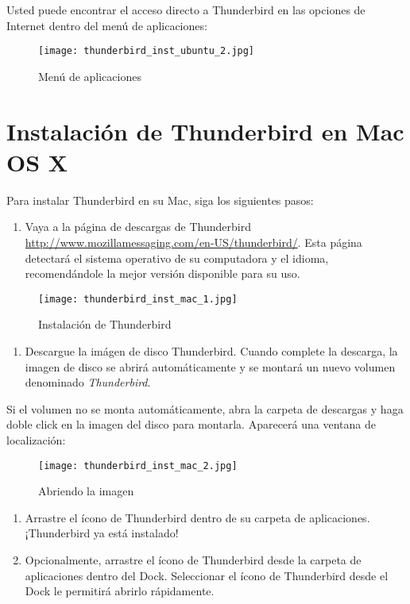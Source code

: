 \documentclass[10pt,a5paper,twoside,,]{book}
\providecommand{\tightlist}{%
  \setlength{\itemsep}{0pt}\setlength{\parskip}{0pt}}
\begin{document}
Usted puede encontrar el acceso directo a Thunderbird en las opciones de
Internet dentro del menú de aplicaciones:

\begin{figure}[htbp]
\centering
\texttt{[image: thunderbird\_inst\_ubuntu\_2.jpg]}
\caption{Menú de aplicaciones}
\end{figure}

\section{Instalación de Thunderbird en Mac OS
X}\label{instalaciuxf3n-de-thunderbird-en-mac-os-x}

Para instalar Thunderbird en su Mac, siga los siguientes pasos:

\begin{enumerate}
\def\labelenumi{\arabic{enumi}.}
\tightlist
\item
  Vaya a la página de descargas de Thunderbird
  \url{http://www.mozillamessaging.com/en-US/thunderbird/}. Esta página
  detectará el sistema operativo de su computadora y el idioma,
  recomendándole la mejor versión disponible para su uso.
\end{enumerate}

\begin{figure}[htbp]
\centering
\texttt{[image: thunderbird\_inst\_mac\_1.jpg]}
\caption{Instalación de Thunderbird}
\end{figure}

\begin{enumerate}
\def\labelenumi{\arabic{enumi}.}
\setcounter{enumi}{1}
\tightlist
\item
  Descargue la imágen de disco Thunderbird. Cuando complete la descarga,
  la imagen de disco se abrirá automáticamente y se montará un nuevo
  volumen denominado \emph{Thunderbird}.
\end{enumerate}

Si el volumen no se monta automáticamente, abra la carpeta de descargas
y haga doble click en la imagen del disco para montarla. Aparecerá una
ventana de localización:

\begin{figure}[htbp]
\centering
\texttt{[image: thunderbird\_inst\_mac\_2.jpg]}
\caption{Abriendo la imagen}
\end{figure}

\begin{enumerate}
\def\labelenumi{\arabic{enumi}.}
\setcounter{enumi}{2}
\tightlist
\item
  Arrastre el ícono de Thunderbird dentro de su carpeta de
  aplicaciones.¡Thunderbird ya está instalado!
\item
  Opcionalmente, arrastre el ícono de Thunderbird desde la carpeta de
  aplicaciones dentro del Dock. Seleccionar el ícono de Thunderbird
  desde el Dock le permitirá abrirlo rápidamente.
\end{enumerate}
\end{document}
